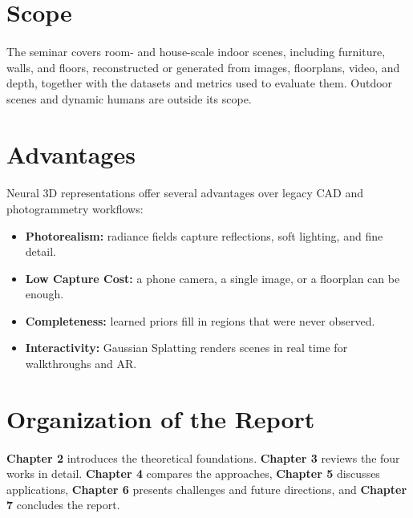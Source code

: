 \documentclass[12pt,a4paper,final]{extreport}
\begin{document}
\section{Scope}

\paragraph{} The seminar covers room- and house-scale indoor scenes, including furniture, walls, and floors, reconstructed or generated from images, floorplans, video, and depth, together with the datasets and metrics used to evaluate them. Outdoor scenes and dynamic humans are outside its scope.

\section{Advantages}

\paragraph{} Neural 3D representations offer several advantages over legacy CAD and photogrammetry workflows:
\begin{itemize}
  \item \textbf{Photorealism:} radiance fields capture reflections, soft lighting, and fine detail.
  \item \textbf{Low Capture Cost:} a phone camera, a single image, or a floorplan can be enough.
  \item \textbf{Completeness:} learned priors fill in regions that were never observed.
  \item \textbf{Interactivity:} Gaussian Splatting renders scenes in real time for walkthroughs and AR.
\end{itemize}

\section{Organization of the Report}

\paragraph{} \textbf{Chapter 2} introduces the theoretical foundations. \textbf{Chapter 3} reviews the four works in detail. \textbf{Chapter 4} compares the approaches, \textbf{Chapter 5} discusses applications, \textbf{Chapter 6} presents challenges and future directions, and \textbf{Chapter 7} concludes the report.
\end{document}
